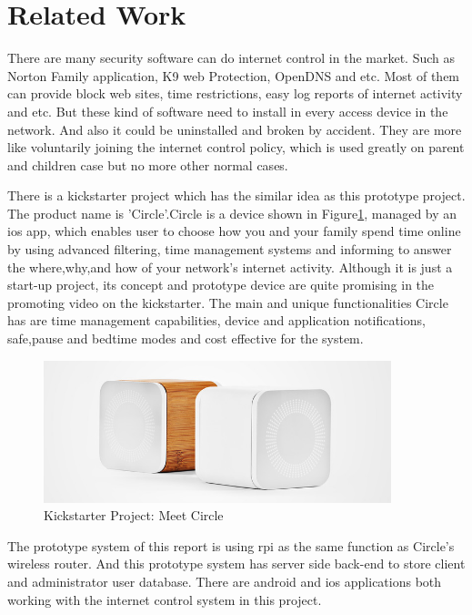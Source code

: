 \section{Related Work}
\par There are many security software can do internet control in the market. Such as Norton Family application\cite{Norton}, K9 web Protection\cite{K9}, OpenDNS\cite{OpenDNS} and etc. Most of them can provide block web sites, time restrictions, easy log reports of internet activity and etc. But these kind of software need to install in every access device in the network. And also it could be uninstalled and broken by accident. They are more like voluntarily joining the internet control policy, which is used greatly on parent and children case but no more other normal cases.
\par There is a kickstarter\cite{kickstarterCircle} project which has the similar idea as this prototype project. The product name is 'Circle'\cite{Circle}.Circle is a device shown in Figure\ref{fig:circle_project}, managed by an \gls{ios} app, which enables user to choose how you and your family spend time online by using advanced filtering, time management systems and informing to answer the where,why,and how of your network's internet activity. Although it is just a start-up project, its concept and prototype device are quite promising in the promoting video on the kickstarter. The main and unique functionalities Circle has are time management capabilities, device and application notifications, safe,pause and bedtime modes and cost effective for the system. 
\begin{figure}
	\centering
    	\includegraphics[width=0.90\textwidth,natwidth=610,natheight=642]{figs/circleDevice.jpg}
  	\caption{Kickstarter Project: Meet Circle}
  	\label{fig:circle_project}
\end{figure}
\par The prototype system of this report is using \gls{rpi} as the same function as Circle's wireless router. And this prototype system has server side back-end to store client and administrator user database. There are android and \gls{ios} applications both working with the internet control system in this project.
